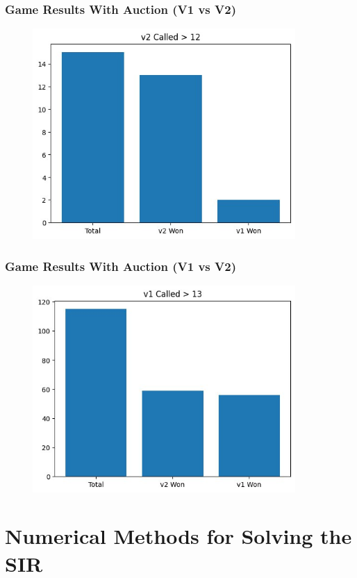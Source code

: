 \documentclass{beamer}
\begin{document}
\begin{frame}\frametitle{Game Results With Auction (V1 vs V2)}
\begin{center}
        \begin{figure}
	    \includegraphics[width=10cm]{v1v2_3.png}
        \end{figure}
\end{center}
\end{frame}

\begin{frame}\frametitle{Game Results With Auction (V1 vs V2)}
\begin{center}
        \begin{figure}
	    \includegraphics[width=10cm]{v1v2_4.png}
        \end{figure}
\end{center}
\end{frame}

\section{Numerical Methods for Solving the SIR}
\end{document}
